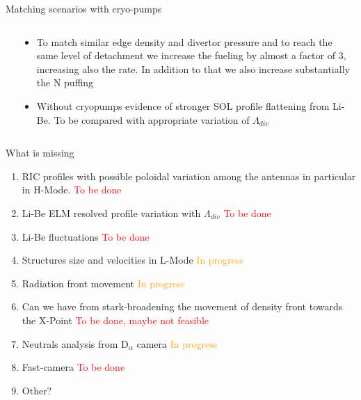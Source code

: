 \documentclass[10pt, compress]{beamer}
\newcommand\Fontvi{\fontsize{8}{7.2}\selectfont}
\begin{document}
\begin{frame}{Matching scenarios with cryo-pumps}
\Fontvi
  \vspace{-1cm}
\begin{columns}
  \begin{column}{0.65\textwidth}
  \end{column}
  \begin{column}{0.35\textwidth}
    \begin{itemize}
      \item<1-> To match similar edge density and divertor pressure
        and to reach the same level of detachment we increase the
        fueling by almost a factor of 3, increasing also the rate. In
        addition to that we also increase substantially the N puffing
      \item<2-> Without cryopumps evidence of stronger SOL profile
        flattening from Li-Be. \alert{To be compared with appropriate
          variation of $\Lambda_{div}$}
    \end{itemize}
  \end{column}
\end{columns}
\end{frame}

\begin{frame}{What is missing}
  \Fontvi
  \begin{enumerate}
    \item RIC profiles with possible poloidal variation among the
      antennas in particular in H-Mode. \textcolor{red}{To be done}
    \item Li-Be ELM resolved profile variation with $\Lambda_{div}$
      \textcolor{red}{To be done}
    \item Li-Be fluctuations \textcolor{red}{To be done}
    \item Structures size and velocities in L-Mode
      \textcolor{orange}{In progress}
    \item Radiation front movement \textcolor{orange}{In progress}
    \item Can we have from stark-broadening the movement of density
      front towards the X-Point \textcolor{red}{To be done, maybe not
        feasible}
    \item Neutrals analysis from D$_{\alpha}$ camera
      \textcolor{orange}{In progress}
    \item Fast-camera \textcolor{red}{To be done}
    \item Other?
  \end{enumerate}
\end{frame}
\end{document}
